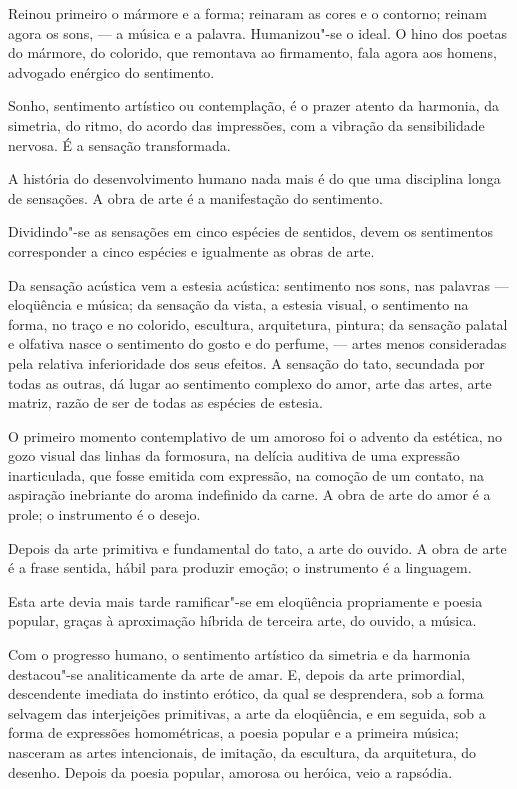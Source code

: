 Reinou primeiro o mármore e a forma; reinaram as cores e o
contorno; reinam agora os sons, --- a música e a palavra.
Humanizou"-se o ideal. O hino dos poetas do mármore, do colorido, que
remontava ao firmamento, fala agora aos homens, advogado enérgico do
sentimento. 

Sonho, sentimento artístico ou contemplação, é o prazer
atento da harmonia, da simetria, do ritmo, do acordo das impressões,
com a vibração da sensibilidade nervosa. É a sensação transformada.

A história do desenvolvimento humano nada mais é do que uma disciplina
longa de sensações. A obra de arte é a manifestação do sentimento.

Dividindo"-se as sensações em cinco espécies de sentidos, devem os
sentimentos corresponder a cinco espécies e igualmente as obras de
arte. 

Da sensação acústica vem a estesia acústica: sentimento nos sons,
nas palavras --- eloqüência e música; da sensação da vista, a estesia
visual, o sentimento na forma, no traço e no colorido, escultura,
arquitetura, pintura; da sensação palatal e olfativa nasce o sentimento
do gosto e do perfume, --- artes menos consideradas pela relativa
inferioridade dos seus efeitos. A sensação do tato, secundada por todas
as outras, dá lugar ao sentimento complexo do amor, arte das artes,
arte matriz, razão de ser de todas as espécies de estesia. 

O primeiro
momento contemplativo de um amoroso foi o advento da estética, no gozo
visual das linhas da formosura, na delícia auditiva de uma expressão
inarticulada, que fosse emitida com expressão, na comoção de um
contato, na aspiração inebriante do aroma indefinido da carne. A obra
de arte do amor é a prole; o instrumento é o desejo. 

Depois da arte
primitiva e fundamental do tato, a arte do ouvido. A obra de arte é a
frase sentida, hábil para produzir emoção; o instrumento é a linguagem.

Esta arte devia mais tarde ramificar"-se em eloqüência propriamente e
poesia popular, graças à aproximação híbrida de terceira arte, do
ouvido, a música. 

Com o progresso humano, o sentimento artístico da
simetria e da harmonia destacou"-se analiticamente da arte de amar. E,
depois da arte primordial, descendente imediata do instinto erótico, da
qual se desprendera, sob a forma selvagem das interjeições primitivas,
a arte da eloqüência, e em seguida, sob a forma de expressões
homométricas, a poesia popular e a primeira música; nasceram as artes
intencionais, de imitação, da escultura, da arquitetura, do desenho.
Depois da poesia popular, amorosa ou heróica, veio a rapsódia. 

